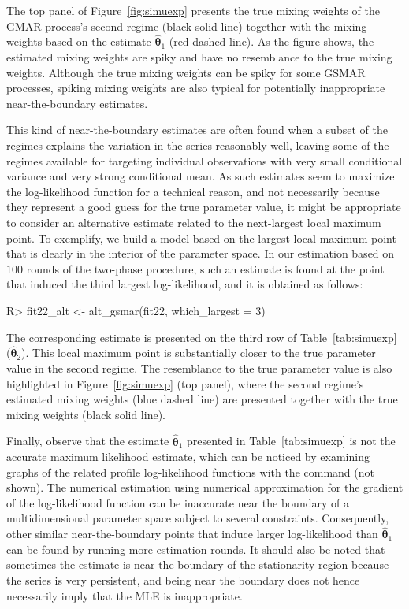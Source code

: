 \documentclass[nojss]{jss} %
\begin{document}
\begin{appendix}
The top panel of Figure~\ref{fig:simuexp} presents the true mixing weights of the GMAR process's second regime (black solid line) together with the mixing weights based on the estimate $\hat{\boldsymbol{\theta}}_1$ (red dashed line). As the figure shows, the estimated mixing weights are spiky and have no resemblance to the true mixing weights. Although the true mixing weights can be spiky for some GSMAR processes, spiking mixing weights are also typical for potentially inappropriate near-the-boundary estimates.

This kind of near-the-boundary estimates are often found when a subset of the regimes explains the variation in the series reasonably well, leaving some of the regimes available for targeting individual observations with very small conditional variance and very strong conditional mean. As such estimates seem to maximize the log-likelihood function for a technical reason, and not necessarily because they represent a good guess for the true parameter value, it might be appropriate to consider an alternative estimate related to the next-largest local maximum point. To exemplify, we build a model based on the largest local maximum point that is clearly in the interior of the parameter space. In our estimation based on $100$ rounds of the two-phase procedure, such an estimate is found at the point that induced the third largest log-likelihood, and it is obtained as follows:
%
\begin{CodeChunk}
\begin{CodeInput}
R> fit22_alt <- alt_gsmar(fit22, which_largest = 3)
\end{CodeInput}
\end{CodeChunk}
%
The corresponding estimate is presented on the third row of Table~\ref{tab:simuexp} ($\hat{\boldsymbol{\theta}}_2$). This local maximum point is substantially closer to the true parameter value in the second regime. The resemblance to the true parameter value is also highlighted in Figure~\ref{fig:simuexp} (top panel), where the second regime's estimated mixing weights (blue dashed line) are presented together with the true mixing weights (black solid line).

Finally, observe that the estimate $\hat{\boldsymbol{\theta}}_1$ presented in Table~\ref{tab:simuexp} is not the accurate maximum likelihood estimate, which can be noticed by examining graphs of the related profile log-likelihood functions with the command  (not shown). The numerical estimation using numerical approximation for the gradient of the log-likelihood function can be inaccurate near the boundary of a multidimensional parameter space subject to several constraints. Consequently, other similar near-the-boundary points that induce larger log-likelihood than $\hat{\boldsymbol{\theta}}_1$ can be found by running more estimation rounds. It should also be noted that sometimes the estimate is near the boundary of the stationarity region because the series is very persistent, and being near the boundary does not hence necessarily imply that the MLE is inappropriate.


\end{appendix}
\end{document}
